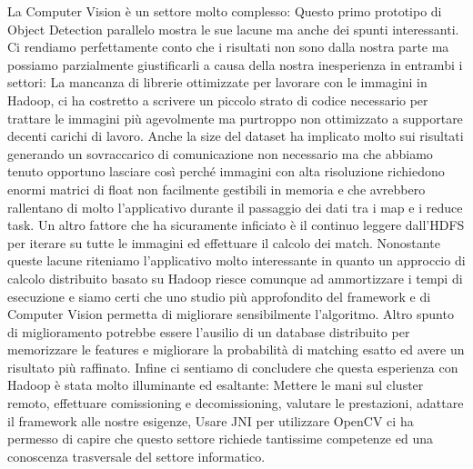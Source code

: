 La Computer Vision è un settore molto complesso: Questo primo prototipo di Object Detection parallelo mostra le sue lacune ma anche dei spunti interessanti. Ci rendiamo perfettamente conto che i risultati non sono dalla nostra parte ma possiamo parzialmente giustificarli a causa della nostra inesperienza in entrambi i settori: La mancanza di librerie ottimizzate per lavorare con le immagini in Hadoop, ci ha costretto a scrivere un piccolo strato di codice necessario per trattare le immagini più agevolmente ma purtroppo non ottimizzato a supportare decenti carichi di lavoro. Anche la size del dataset ha implicato molto sui risultati generando un sovraccarico di comunicazione non necessario ma che abbiamo tenuto opportuno lasciare così perché immagini con alta risoluzione richiedono enormi matrici di float non facilmente gestibili in memoria e che avrebbero rallentano di molto l'applicativo durante il passaggio dei dati tra i map e i reduce task. Un altro fattore che ha sicuramente inficiato è il continuo leggere dall'HDFS per iterare su tutte le immagini ed effettuare il calcolo dei match. Nonostante queste lacune riteniamo l'applicativo molto interessante in quanto un approccio di calcolo distribuito basato su Hadoop riesce comunque ad ammortizzare i tempi di esecuzione e siamo certi che uno studio più approfondito del framework e di Computer Vision permetta di migliorare sensibilmente l'algoritmo. Altro spunto di miglioramento potrebbe essere l'ausilio di un database distribuito per memorizzare le features e migliorare la probabilità di matching esatto ed avere un risultato più raffinato. Infine ci sentiamo di concludere che questa esperienza con Hadoop è stata molto illuminante ed esaltante: Mettere le mani sul cluster remoto, effettuare comissioning e decomissioning, valutare le prestazioni, adattare il framework alle nostre esigenze, Usare JNI per utilizzare OpenCV ci ha permesso di capire che questo settore richiede tantissime competenze ed una conoscenza trasversale del settore informatico. 